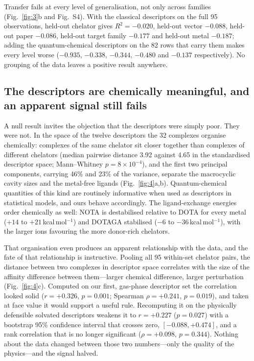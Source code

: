 Transfer fails at every level of generalisation, not only across families (Fig.~\ref{fig:3}b and Fig.~S4). With the classical descriptors on the full 95 observations, held-out chelator gives $R^2 = -0.020$, held-out vector $-0.088$, held-out paper $-0.086$, held-out target family $-0.177$ and held-out metal $-0.187$; adding the quantum-chemical descriptors on the 82 rows that carry them makes every level worse ($-0.935$, $-0.338$, $-0.344$, $-0.480$ and $-0.137$ respectively). No grouping of the data leaves a positive result anywhere.

\subsection{The descriptors are chemically meaningful, and an apparent signal still fails}

A null result invites the objection that the descriptors were simply poor. They were not. In the space of the twelve descriptors the 32 complexes organise chemically: complexes of the same chelator sit closer together than complexes of different chelators (median pairwise distance 3.92 against 4.65 in the standardised descriptor space; Mann--Whitney $p = 8 \times 10^{-4}$), and the first two principal components, carrying 46\% and 23\% of the variance, separate the macrocyclic cavity sizes and the metal-free ligands (Fig.~\ref{fig:4}a,b). Quantum-chemical quantities of this kind are routinely informative when used as descriptors in statistical models,\cite{Kang2025QSAR} and ours behave accordingly. The ligand-exchange energies order chemically as well: NOTA is destabilised relative to DOTA for every metal ($+14$ to $+21$\,kcal\,mol$^{-1}$) and DOTAGA stabilised ($-6$ to $-36$\,kcal\,mol$^{-1}$), with the larger ions favouring the more donor-rich chelators.

That organisation even produces an apparent relationship with the data, and the fate of that relationship is instructive. Pooling all 95 within-set chelator pairs, the distance between two complexes in descriptor space correlates with the size of the affinity difference between them---larger chemical difference, larger perturbation (Fig.~\ref{fig:4}c). Computed on our first, gas-phase descriptor set the correlation looked solid ($r = +0.326$, $p = 0.001$; Spearman $\rho = +0.241$, $p = 0.019$), and taken at face value it would support a useful rule. Recomputing it on the physically defensible solvated descriptors weakens it to $r = +0.227$ ($p = 0.027$) with a bootstrap 95\% confidence interval that crosses zero, $[-0.088, +0.474]$, and a rank correlation that is no longer significant ($\rho = +0.098$, $p = 0.344$). Nothing about the data changed between those two numbers---only the quality of the physics---and the signal halved.

